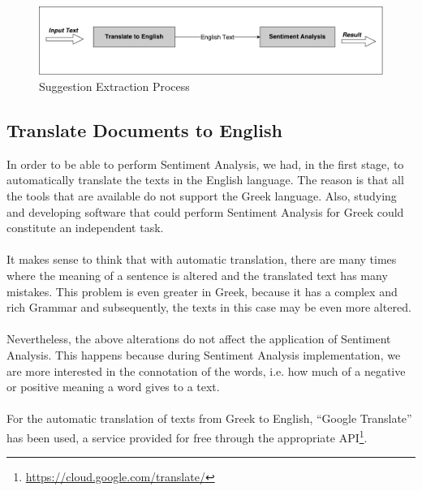 \begin{figure}[H]
\centering
\includegraphics[width=1\linewidth]{figure/methods/overall_extraction.pdf}
\caption{Suggestion Extraction Process}
\end{figure}

\subsection{Translate Documents to English}\label{341_ref}
In order to be able to perform Sentiment Analysis, we had, in the first stage, to automatically translate the texts in the English language. The reason is that all the tools that are available do not support the Greek language. Also, studying and developing software that could perform Sentiment Analysis for Greek could constitute an independent task.\\
\\
It makes sense to think that with automatic translation, there are many times where the meaning of a sentence is altered and the translated text has many mistakes. This problem is even greater in Greek, because it has a complex and rich Grammar and subsequently, the texts in this case may be even more altered.\\
\\
Nevertheless, the above alterations do not affect the application of Sentiment Analysis. This happens because during Sentiment Analysis implementation, we are more interested in the connotation of the words, i.e. how much of a negative or positive meaning a word gives to a text.\\
\\
For the automatic translation of texts  from Greek to English, ``Google Translate'' has been used, a service provided for free through the appropriate API\footnote{\url{https://cloud.google.com/translate/}}.
